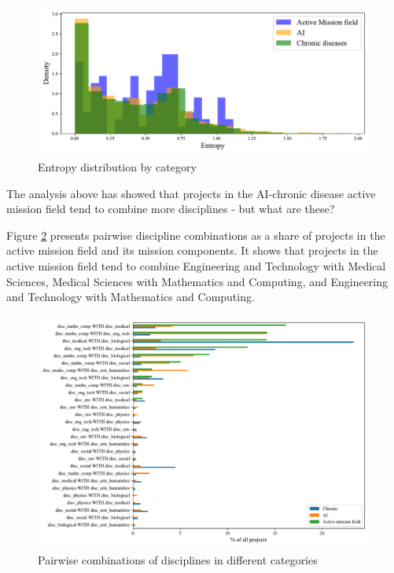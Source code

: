 \documentclass[11pt]{article}
\begin{document}
\begin{figure}[!ht]
    \centering
    \includegraphics[width=\textwidth]{figures/fig_11_disc_histogram.pdf}
    \caption{Entropy distribution by category}
    \label{fig:disc_count_discrete}
\end{figure}

The analysis above has showed that projects in the AI-chronic disease active mission field tend to combine more disciplines - but what are these?

Figure \ref{fig:disc_pairs} presents pairwise discipline combinations as a share of projects in the active mission field and its mission components. It shows that projects in the active mission field tend to combine Engineering and Technology with Medical Sciences, Medical Sciences with Mathematics and Computing, and Engineering and Technology with Mathematics and Computing. 

\begin{figure}[!ht]
    \centering
    \includegraphics[width=\textwidth]{figures/fig_12_disc_combs.pdf}
    \caption{Pairwise combinations of disciplines in different categories}
    \label{fig:disc_pairs}
\end{figure}
\end{document}
